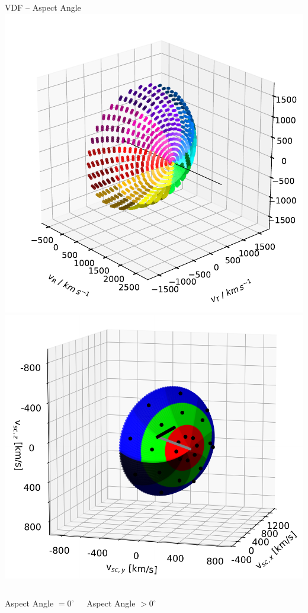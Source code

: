 \documentclass{beamer}
\begin{document}
\begin{frame}{VDF -- Aspect Angle}
	\vspace{1.cm}
	\includegraphics[scale=0.4]{Pics/V-Spacetest.pdf}
	\includegraphics[scale=0.35]{Pics/figure_2-1_swics.pdf}
	\begin{columns}
		\vspace{1.5cm}
		\column[]{5cm}
		\begin{center}
			Aspect Angle $= 0 ^{\circ}$
		\end{center}
		\column[]{5cm}
		\begin{center}
			Aspect Angle $> 0 ^{\circ}$
		\end{center}
	\end{columns}
\end{frame}
\end{document}
